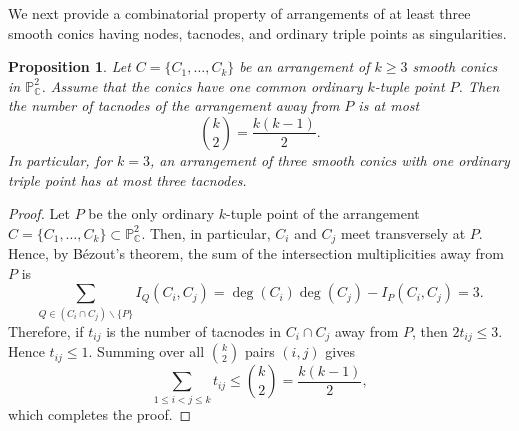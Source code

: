\documentclass[11pt]{article}
\theoremstyle{plain}
\newtheorem{proposition}[thm]{Proposition}
\newtheorem{corollary}[thm]{Corollary}
\theoremstyle{definition}
\newtheorem{remark}[thm]{Remark}
\begin{document}
We next provide a combinatorial property of arrangements of at least three smooth conics having nodes, tacnodes, and ordinary triple points as singularities.


\begin{proposition} \label{prop:oneD4}
Let \(C=\{C_1,\ldots,C_k\}\) be an arrangement of \(k\geq 3\) smooth
conics in \(\mathbb P^2_{\mathbb C}\). Assume that the conics have one
common ordinary \(k\)-tuple point \(P\). Then the number of tacnodes of
the arrangement away from \(P\) is at most
\[
\binom{k}{2}=\frac{k(k-1)}{2}.
\]
In particular, for \(k=3\), an arrangement of three smooth conics with
one ordinary triple point has at most three tacnodes.
\end{proposition}

\begin{proof}
    Let $P$ be the only ordinary $k$-tuple point of the arrangement $C=\{C_1,\ldots,C_k\}\subset\mathbb{P}^2_\mathbb{C}$. Then, in particular, $C_i$ and $C_j$ meet transversely at $P$. Hence, by B\'ezout's theorem, the sum of the intersection multiplicities away from $P$ is
    $$\sum_{Q\in(C_i\cap C_j)\backslash\{P\}}I_Q(C_i,C_j) = \deg(C_i)\deg(C_j)-I_P(C_i,C_j)=3.$$
    Therefore, if $t_{ij}$ is the number of tacnodes in $C_i\cap C_j$ away from $P$, then
    $2t_{ij}\leq 3$. Hence $t_{ij}\leq 1$. Summing over all $\binom{k}{2}$ pairs $(i,j)$ gives
    $$\sum_{1\leq i<j\leq k}t_{ij}\leq \binom{k}{2}=\frac{k(k-1)}{2},$$
    which completes the proof.
\end{proof}

\end{document}
